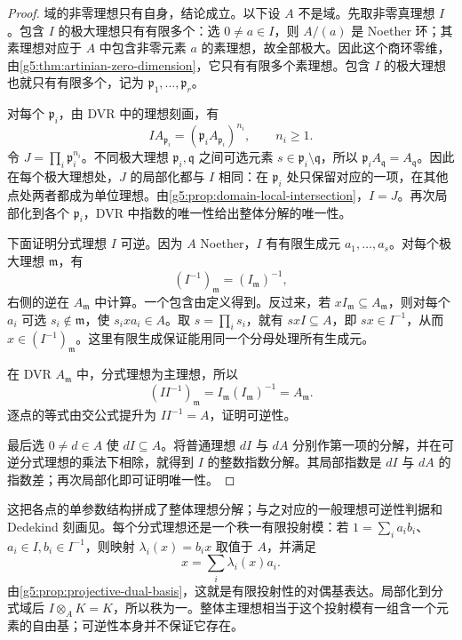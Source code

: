 \begin{proof}
	域的非零理想只有自身，结论成立。以下设 \(A\) 不是域。先取非零真理想 \(I\)。包含 \(I\) 的极大理想只有有限多个：选 \(0\ne a\in I\)，则 \(A/(a)\) 是 Noether 环；其素理想对应于 \(A\) 中包含非零元素 \(a\) 的素理想，故全部极大。因此这个商环零维，由\cref{g5:thm:artinian-zero-dimension}，它只有有限多个素理想。包含 \(I\) 的极大理想也就只有有限多个，记为 \(\mathfrak p_1,\ldots,\mathfrak p_r\)。

	对每个 \(\mathfrak p_i\)，由 DVR 中的理想刻画，有
	\[
		IA_{\mathfrak p_i}
		=(\mathfrak p_iA_{\mathfrak p_i})^{n_i},
		\qquad n_i\geq1.
	\]
	令 \(J=\prod_i\mathfrak p_i^{n_i}\)。不同极大理想 \(\mathfrak p_i,\mathfrak q\) 之间可选元素 \(s\in\mathfrak p_i\setminus\mathfrak q\)，所以 \(\mathfrak p_iA_{\mathfrak q}=A_{\mathfrak q}\)。因此在每个极大理想处，\(J\) 的局部化都与 \(I\) 相同：在 \(\mathfrak p_i\) 处只保留对应的一项，在其他点处两者都成为单位理想。由\cref{g5:prop:domain-local-intersection}，\(I=J\)。再次局部化到各个 \(\mathfrak p_i\)，DVR 中指数的唯一性给出整体分解的唯一性。

	下面证明分式理想 \(I\) 可逆。因为 \(A\) Noether，\(I\) 有有限生成元 \(a_1,\ldots,a_s\)。对每个极大理想 \(\mathfrak m\)，有
	\[
		(I^{-1})_{\mathfrak m}=(I_{\mathfrak m})^{-1},
	\]
	右侧的逆在 \(A_{\mathfrak m}\) 中计算。一个包含由定义得到。反过来，若 \(xI_{\mathfrak m}\subseteq A_{\mathfrak m}\)，则对每个 \(a_i\) 可选 \(s_i\notin\mathfrak m\)，使 \(s_i x a_i\in A\)。取 \(s=\prod_i s_i\)，就有 \(sxI\subseteq A\)，即 \(sx\in I^{-1}\)，从而 \(x\in(I^{-1})_{\mathfrak m}\)。这里有限生成保证能用同一个分母处理所有生成元。

	在 DVR \(A_{\mathfrak m}\) 中，分式理想为主理想，所以
	\[
		(II^{-1})_{\mathfrak m}
		=I_{\mathfrak m}(I_{\mathfrak m})^{-1}
		=A_{\mathfrak m}.
	\]
	逐点的等式由交公式提升为 \(II^{-1}=A\)，证明可逆性。

	最后选 \(0\ne d\in A\) 使 \(dI\subseteq A\)。将普通理想 \(dI\) 与 \(dA\) 分别作第一项的分解，并在可逆分式理想的乘法下相除，就得到 \(I\) 的整数指数分解。其局部指数是 \(dI\) 与 \(dA\) 的指数差；再次局部化即可证明唯一性。
\end{proof}

这把各点的单参数结构拼成了整体理想分解；与之对应的一般理想可逆性判据和 Dedekind 刻画见\cite[第11节，定理11.3、11.6，第80--83页]{Matsumura1989}。每个分式理想还是一个秩一有限投射模：若 \(1=\sum_i a_ib_i\)、\(a_i\in I,b_i\in I^{-1}\)，则映射 \(\lambda_i(x)=b_ix\) 取值于 \(A\)，并满足
\[
	x=\sum_i\lambda_i(x)a_i.
\]
由\cref{g5:prop:projective-dual-basis}，这就是有限投射性的对偶基表达。局部化到分式域后 \(I\otimes_AK=K\)，所以秩为一。整体主理想相当于这个投射模有一组含一个元素的自由基；可逆性本身并不保证它存在。

